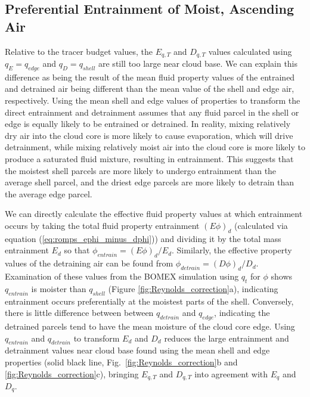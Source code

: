 \documentclass[12pt]{article}
\begin{document}

\subsection{Preferential Entrainment of Moist, Ascending Air}

Relative to the tracer budget values, the $E_{q,T}$ and 
$D_{q,T}$ values calculated using $q_E = q_{edge}$ and $q_D = q_{shell}$ 
are still too large near cloud base. We can explain this difference as 
being the result of the mean fluid property values of the entrained and 
detrained air being different than the mean value of the shell and edge 
air, respectively.  Using the mean shell and edge values of properties to 
transform the direct entrainment and detrainment assumes that any 
fluid parcel in the shell or edge is equally likely to be entrained or 
detrained.  In reality, mixing relatively dry air into the cloud core is 
more likely to cause evaporation, which will drive detrainment, while 
mixing relatively moist air into the cloud core is more likely to 
produce a saturated fluid mixture, resulting in entrainment.  This 
suggests that the moistest shell parcels are more likely to undergo 
entrainment than the average shell parcel, and the driest edge parcels 
are more likely to detrain than the average edge parcel.

We can directly calculate the effective fluid property values at which 
entrainment occurs by taking the total fluid property entrainment 
$(E\phi)_d$ (calculated via equation (\ref{eq:romps_ephi_minus_dphi}))
and dividing it by the total mass entrainment $E_d$ so that 
$\phi_{entrain} = (E\phi)_d / E_d$.  Similarly, the effective property 
values of the detraining air can be found from  
$\phi_{detrain} = (D\phi)_d / D_d$.  Examination of these values from
the BOMEX simulation using $q_t$ for $\phi$ shows $q_{entrain}$ is 
moister than $q_{shell}$ (Figure \ref{fig:Reynolds_correction}a), 
indicating entrainment occurs preferentially at the moistest parts 
of the shell.  Conversely, there is little difference between between 
$q_{detrain}$ and $q_{edge}$, indicating the detrained parcels tend to 
have the mean moisture of the cloud core edge.  Using $q_{entrain}$ and 
$q_{detrain}$ to transform $E_d$ and $D_d$ reduces the large entrainment 
and detrainment values near cloud base found using the mean shell and 
edge properties (solid black line, Fig.~\ref{fig:Reynolds_correction}b 
and \ref{fig:Reynolds_correction}c), bringing $E_{q,T}$ and $D_{q,T}$ 
into agreement with $E_q$ and $D_q$.
\end{document}
